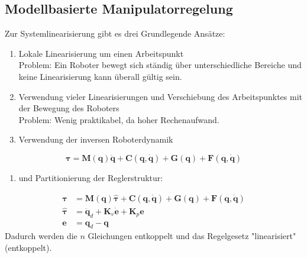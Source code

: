 \documentclass[a4paper, 11pt, accentcolor = tud3b]{tudreport}
\newcommand{\mat}[1]{\boldsymbol{#1}}
\renewcommand{\vec}[1]{\boldsymbol{#1}}
\begin{document}
			\subsection{Modellbasierte Manipulatorregelung}
				Zur Systemlinearisierung gibt es drei Grundlegende Ansätze:
				\begin{enumerate}
					\item Lokale Linearisierung um einen Arbeitspunkt \\ Problem: Ein Roboter bewegt sich ständig über unterschiedliche Bereiche und keine Linearisierung kann überall gültig sein.
					\item Verwendung vieler Linearisierungen und Verschiebung des Arbeitspunktes mit der Bewegung des Roboters \\ Problem: Wenig praktikabel, da hoher Rechenaufwand.
					\item Verwendung der inversen Roboterdynamik
				\end{enumerate}
				\begin{equation*}
					\vec{\tau} = \mat{M}(\vec{q}) \ddot{\vec{q}} + \vec{C}(\vec{q}, \dot{\vec{q}}) + \vec{G}(\vec{q}) + \vec{F}(\vec{q}, \dot{\vec{q}})
				\end{equation*}
				\begin{enumerate}
					\item[] und Partitionierung der Reglerstruktur:
				\end{enumerate}
				\vspace{-0.5cm}
				\begin{align*}
					\vec{\tau}       & = \mat{M}(\vec{q})\hat{\vec{\tau}} + \vec{C}(\vec{q}, \dot{\vec{q}}) + \vec{G}(\vec{q}) + \vec{F}(\vec{q}, \dot{\vec{q}}) \\
					\hat{\vec{\tau}} & = \ddot{\vec{q}}_d + \mat{K}_v \dot{\vec{e}} + \mat{K}_p \vec{e}                                                          \\
					\vec{e}          & = \vec{q}_d - \vec{q}
				\end{align*}
				Dadurch werden die \(n\) Gleichungen entkoppelt und das Regelgesetz "linearisiert" (entkoppelt).
				
\end{document}
